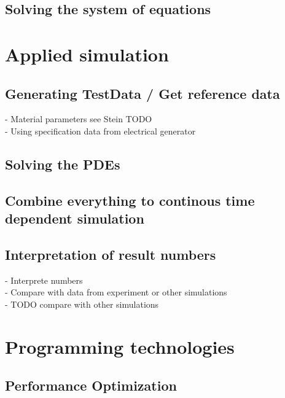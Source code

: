 \documentclass[parskip=half, titlepage=yes, 12pt, BCOR=12mm, DIV=calc]{scrartcl}
\begin{document}
\subsection{Solving the system of equations}




\section{Applied simulation}
\subsection{Generating TestData / Get reference data}
- Material parameters see Stein TODO \\
- Using specification data from electrical generator \\

\subsection{Solving the PDEs}
\subsection{Combine everything to continous time dependent simulation}
\subsection{Interpretation of result numbers}
- Interprete numbers \\
- Compare with data from experiment or other simulations \\
- TODO compare with other simulations \\

\section{Programming technologies}

\subsection{Performance Optimization}
\end{document}
